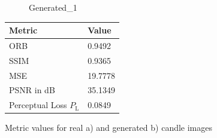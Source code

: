 \documentclass[12pt,DIV14,BCOR12mm,a4paper,footinclude=false,headinclude,parskip=half-,twoside,openright,cleardoublepage=empty,toc=index,bibliography=totoc,listof=totoc]{scrreprt}
\numberwithin{equation}{chapter}
\begin{document}
\begin{figure}
\begin{minipage}[H]{\linewidth}
\begin{minipage}[H]{0.5\linewidth}
\begin{subfigure}[t]{0.48\linewidth}
                \caption{Generated\_1}
            \end{subfigure}
        \end{minipage}%
        \hfill
        \begin{minipage}[H]{0.5\linewidth} %
            \centering
            \small
            \begin{tabular}{p{3cm} p{2cm}}
                \toprule
                \textbf{Metric} & \textbf{Value} \\
                \midrule
                ORB             & 0.9492        \\
                SSIM            & 0.9365        \\
                MSE             & 19.7778       \\
                PSNR in dB      & 35.1349       \\
                Perceptual Loss \( P_{\text{L}} \) & 0.0849        \\
                \bottomrule
            \end{tabular}
        \end{minipage}%
        \caption{Metric values for real a) and generated b) candle images}
        \label{fig:comparison_real_generated_1_1_candle}
    \end{minipage}
\end{figure}
\end{document}

